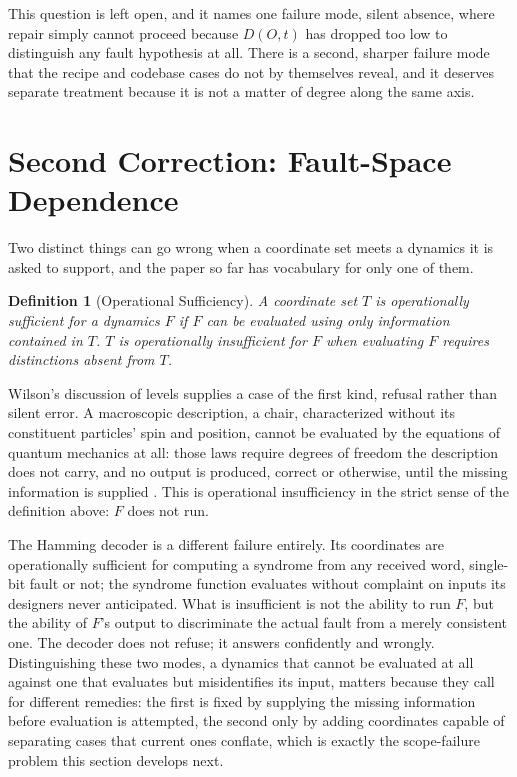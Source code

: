 \documentclass[11pt]{article}
\newtheorem{definition}{Definition}[section]
\begin{document}
This question is left open, and it names one failure mode, silent absence, where repair simply cannot proceed because $D(O,t)$ has dropped too low to distinguish any fault hypothesis at all. There is a second, sharper failure mode that the recipe and codebase cases do not by themselves reveal, and it deserves separate treatment because it is not a matter of degree along the same axis.

\section{Second Correction: Fault-Space Dependence}

Two distinct things can go wrong when a coordinate set meets a dynamics it is asked to support, and the paper so far has vocabulary for only one of them.

\begin{definition}[Operational Sufficiency]
A coordinate set $T$ is operationally sufficient for a dynamics $F$ if $F$ can be evaluated using only information contained in $T$. $T$ is operationally insufficient for $F$ when evaluating $F$ requires distinctions absent from $T$.
\end{definition}

Wilson's discussion of levels supplies a case of the first kind, refusal rather than silent error. A macroscopic description, a chair, characterized without its constituent particles' spin and position, cannot be evaluated by the equations of quantum mechanics at all: those laws require degrees of freedom the description does not carry, and no output is produced, correct or otherwise, until the missing information is supplied \cite{wilson2014}. This is operational insufficiency in the strict sense of the definition above: $F$ does not run.

The Hamming decoder is a different failure entirely. Its coordinates are operationally sufficient for computing a syndrome from any received word, single-bit fault or not; the syndrome function evaluates without complaint on inputs its designers never anticipated. What is insufficient is not the ability to run $F$, but the ability of $F$'s output to discriminate the actual fault from a merely consistent one. The decoder does not refuse; it answers confidently and wrongly. Distinguishing these two modes, a dynamics that cannot be evaluated at all against one that evaluates but misidentifies its input, matters because they call for different remedies: the first is fixed by supplying the missing information before evaluation is attempted, the second only by adding coordinates capable of separating cases that current ones conflate, which is exactly the scope-failure problem this section develops next.
\end{document}

